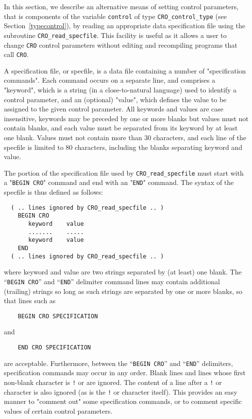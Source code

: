 \documentclass{galahad}
\newcommand{\packagename}{CRO}
\begin{document}

\galfeatures
\noindent In this section, we describe an alternative means of setting
control parameters, that is components of the variable {\tt control} of type
{\tt \packagename\_control\_type}
(see Section~\ref{typecontrol}),
by reading an appropriate data specification file using the
subroutine {\tt \packagename\_read\_specfile}. This facility
is useful as it allows a user to change  {\tt \packagename} control parameters
without editing and recompiling programs that call {\tt \packagename}.

A specification file, or specfile, is a data file containing a number of
"specification commands". Each command occurs on a separate line,
and comprises a "keyword",
which is a string (in a close-to-natural language) used to identify a
control parameter, and
an (optional) "value", which defines the value to be assigned to the given
control parameter. All keywords and values are case insensitive,
keywords may be preceded by one or more blanks but
values must not contain blanks, and
each value must be separated from its keyword by at least one blank.
Values must not contain more than 30 characters, and
each line of the specfile is limited to 80 characters,
including the blanks separating keyword and value.



The portion of the specification file used by
{\tt \packagename\_read\_specfile}
must start
with a "{\tt BEGIN \packagename}" command and end with an
"{\tt END}" command.  The syntax of the specfile is thus defined as follows:
\begin{verbatim}
  ( .. lines ignored by CRO_read_specfile .. )
    BEGIN CRO
       keyword    value
       .......    .....
       keyword    value
    END
  ( .. lines ignored by CRO_read_specfile .. )
\end{verbatim}
where keyword and value are two strings separated by (at least) one blank.
The ``{\tt BEGIN \packagename}'' and ``{\tt END}'' delimiter command lines
may contain additional (trailing) strings so long as such strings are
separated by one or more blanks, so that lines such as
\begin{verbatim}
    BEGIN CRO SPECIFICATION
\end{verbatim}
and
\begin{verbatim}
    END CRO SPECIFICATION
\end{verbatim}
are acceptable. Furthermore,
between the
``{\tt BEGIN \packagename}'' and ``{\tt END}'' delimiters,
specification commands may occur in any order.  Blank lines and
lines whose first non-blank character is {\tt !} or {\tt *} are ignored.
The content
of a line after a {\tt !} or {\tt *} character is also
ignored (as is the {\tt !} or {\tt *}
character itself). This provides an easy manner to "comment out" some
specification commands, or to comment specific values
of certain control parameters.
\end{document}
